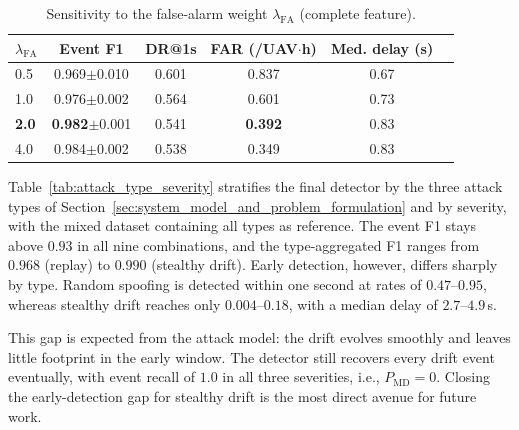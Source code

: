 \begin{table}[htbp]
  \centering
  \caption{Sensitivity to the false-alarm weight $\lambda_{\mathrm{FA}}$
    (complete feature).}
  \label{tab:fa_sweep}
  \begin{tabular}{lcccc c}
    \toprule
    $\lambda_{\mathrm{FA}}$ & Event F1 & DR@1s & FAR (/UAV$\cdot$h) & Med. delay (s) \\
    \midrule
    0.5 & 0.969$\pm$0.010 & 0.601 & 0.837 & 0.67 \\
    1.0 & 0.976$\pm$0.002 & 0.564 & 0.601 & 0.73 \\
    \textbf{2.0} & \textbf{0.982}$\pm$0.001 & 0.541 & \textbf{0.392} & 0.83 \\
    4.0 & 0.984$\pm$0.002 & 0.538 & 0.349 & 0.83 \\
    \bottomrule
  \end{tabular}
\end{table}

Table~\ref{tab:attack_type_severity} stratifies the final detector by the
three attack types of Section~\ref{sec:system_model_and_problem_formulation}
and by severity, with the mixed dataset containing all types as reference.
The event F1 stays above $0.93$ in all nine combinations, and the
type-aggregated F1 ranges from $0.968$ (replay) to $0.990$ (stealthy drift).
Early detection, however, differs sharply by type. Random spoofing is
detected within one second at rates of $0.47$--$0.95$, whereas stealthy
drift reaches only $0.004$--$0.18$, with a median delay of
$2.7$--$4.9$\,s.

This gap is expected from the attack model: the drift evolves smoothly and
leaves little footprint in the early window. The detector still recovers
every drift event eventually, with event recall of $1.0$ in all three
severities, i.e., $P_{\mathrm{MD}}{=}0$. Closing the early-detection gap for
stealthy drift is the most direct avenue for future work.

